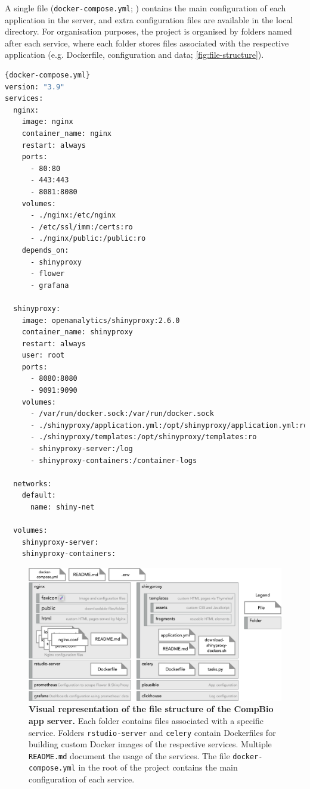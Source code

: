 A single file (\texttt{docker-compose.yml}; ) contains the main configuration of each application in the server, and extra configuration files are available in the local directory. For organisation purposes, the project is organised by folders named after each service, where each folder stores files associated with the respective application (e.g. Dockerfile, configuration and data; \autoref{fig:file-structure}).

\begin{lstlisting}[caption=Shortened version of the \texttt{docker-compose.yml} file used for the project. This version only contains the configuration for Nginx and ShinyProxy.,language=bash,label={lst:docker-compose.yml}]{docker-compose.yml}
version: "3.9"
services:
  nginx:
    image: nginx
    container_name: nginx
    restart: always
    ports:
      - 80:80
      - 443:443
      - 8081:8080
    volumes:
      - ./nginx:/etc/nginx
      - /etc/ssl/imm:/certs:ro
      - ./nginx/public:/public:ro
    depends_on:
      - shinyproxy
      - flower
      - grafana

  shinyproxy:
    image: openanalytics/shinyproxy:2.6.0
    container_name: shinyproxy
    restart: always
    user: root
    ports:
      - 8080:8080
      - 9091:9090
    volumes:
      - /var/run/docker.sock:/var/run/docker.sock
      - ./shinyproxy/application.yml:/opt/shinyproxy/application.yml:ro
      - ./shinyproxy/templates:/opt/shinyproxy/templates:ro
      - shinyproxy-server:/log
      - shinyproxy-containers:/container-logs
  
  networks:
    default:
      name: shiny-net

  volumes:
    shinyproxy-server:
    shinyproxy-containers:
\end{lstlisting}

\begin{figure}[!ht]
  \includegraphics[width=1\textwidth]{images/app-server/file-structure}
  \centering
  \caption[App server's file structure]{\textbf{Visual representation of the file structure of the CompBio app server.} Each folder contains files associated with a specific service. Folders \texttt{rstudio-server} and \texttt{celery} contain Dockerfiles for building custom Docker images of the respective services. Multiple \texttt{README.md} document the usage of the services. The file \texttt{docker-compose.yml} in the root of the project contains the main configuration of each service.}
  \label{fig:file-structure}
\end{figure}

